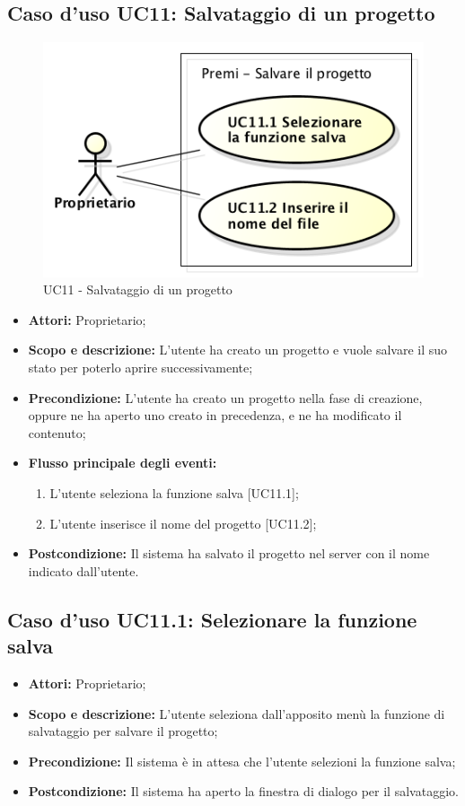 \subsection{Caso d'uso UC11: Salvataggio di un progetto}
\begin{figure}[h] 
	\centering 
	\includegraphics[scale=0.45] {img/UC11.png}
	\caption{UC11 - Salvataggio di un progetto} 
\end{figure}

\begin{itemize}
	\item \textbf{Attori:} Proprietario;
	\item \textbf{Scopo e descrizione:} L'utente ha creato un progetto e vuole salvare il suo stato per poterlo aprire successivamente;
	\item \textbf{Precondizione:} L'utente ha creato un progetto nella fase di creazione, oppure ne ha aperto uno creato in precedenza, e ne ha modificato il contenuto;
	\item \textbf{Flusso principale degli eventi:}
	\begin{enumerate}
		\item L'utente seleziona la funzione salva [UC11.1];
		\item L'utente inserisce il nome del progetto [UC11.2];
	\end{enumerate}
	\item \textbf{Postcondizione:} Il sistema ha salvato il progetto nel server con il nome indicato dall'utente.
\end{itemize}


\subsection{Caso d'uso UC11.1: Selezionare la funzione salva}
\begin{itemize}
	\item \textbf{Attori:} Proprietario;
	\item \textbf{Scopo e descrizione:} L'utente seleziona dall'apposito menù la funzione di salvataggio per salvare il progetto;
	\item \textbf{Precondizione:} Il sistema è in attesa che l'utente selezioni la funzione salva;
	\item \textbf{Postcondizione:} Il sistema ha aperto la finestra di dialogo per il salvataggio.
\end{itemize}


